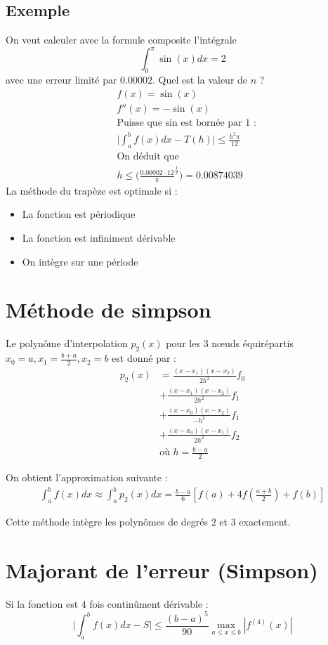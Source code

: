 \documentclass[a4paper,9pt]{extarticle}
\begin{document}
\subsection*{Exemple}
On veut calculer avec la formule composite l'intégrale 
$$\int_0^\pi\sin(x)dx=2$$
avec une erreur limité par $0.00002$. Quel est la valeur de $n$ ?
\begin{align*}
& f(x)=\sin(x)\\
& f''(x)=-\sin(x)\\
& \text{Puisse que sin est bornée par 1 :}\\
& \Big|\int_a^bf(x)dx-T(h)\Big| \leq \frac{h^2\pi}{12}\\
& \text{On déduit que} \\
& h \leq \Big(\frac{0.00002\cdot12}{\pi}^{\frac{1}{2}}\Big)=0.00874039
\end{align*}
La méthode du trapèze est optimale si :
\begin{itemize}
    \item La fonction est périodique
    \item La fonction est infiniment dérivable
    \item On intègre sur une période
\end{itemize}

\section{Méthode de simpson}
Le polynôme d'interpolation $p_2(x)$ pour les 3 nœuds équirépartis $x_0=a,x_1=\frac{b+a}{2},x_2=b$ est donné par :
\begin{align*}
p_2(x)&=\frac{(x-x_1)(x-x_2)}{2h^2}f_0\\
&+\frac{(x-x_1)(x-x_2)}{2h^2}f_1\\
&+\frac{(x-x_0)(x-x_2)}{-h^2}f_1\\
&+\frac{(x-x_0)(x-x_1)}{2h^2}f_2\\
& \text{où } h=\frac{b-a}{2}
\end{align*}

On obtient l'approximation suivante :
\begin{align*}
\int_a^bf(x)dx \approx \int_a^bp_2(x)dx = \frac{b-a}{6}[f(a)+4f(\frac{a+b}{2})+f(b)]
\end{align*}

Cette méthode intègre les polynômes de degrés $2$ et $3$ exactement.

\section{Majorant de l'erreur (Simpson)}
Si la fonction est $4$ fois continûment dérivable :
$$
\Big|\int_a^bf(x)dx-S\Big| \leq \frac{(b-a)^5}{90}\max_{a\leq x\leq b}|f^{(4)}(x)|
$$
\end{document}
